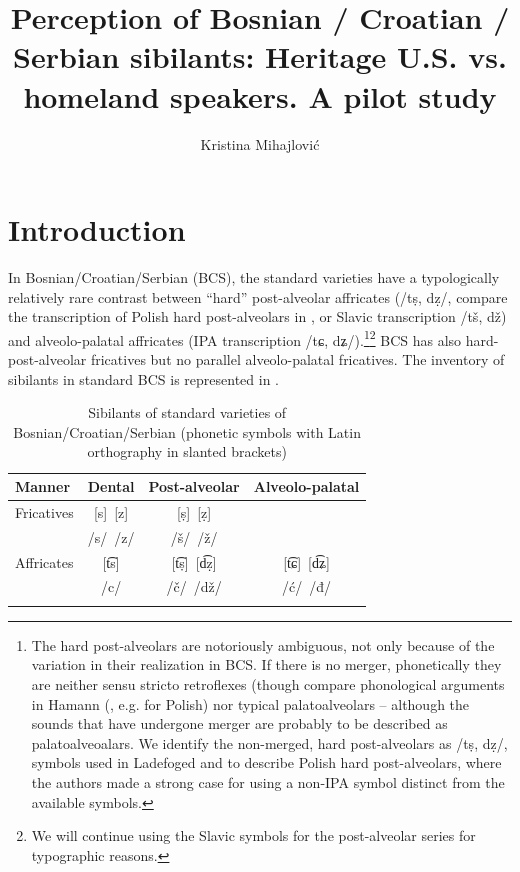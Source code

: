 \documentclass[output=paper,modfonts,nonflat,
]{langsci/langscibook}
\author{Kristina Mihajlović\affiliation{Department of Linguistics, University of Arizona}\lastand{Małgorzata Ćavar\affiliation{Department of Linguistics, Indiana University}}}
\title{Perception of Bosnian / Croatian / Serbian sibilants: Heritage U.S. vs. homeland speakers. A pilot study}
\begin{document}
\maketitle 
{}

 

\section{Introduction}

In Bosnian/Croatian/Serbian (BCS), the standard varieties have a typologically relatively rare contrast between “hard” post-alveolar affricates (/tṣ, dẓ/, compare the transcription of Polish  hard post-alveolars in \citet{LadefogedDisner2012}, or Slavic transcription /tš, dž) and alveolo-palatal affricates (IPA transcription /tɕ, dʑ/).\footnote{The hard post-alveolars are notoriously ambiguous, not only because of the variation in their realization in BCS. If there is no merger, phonetically they are neither sensu stricto retroflexes (though compare phonological arguments in Hamann (\citeyear*{Hamann2003}, e.g. for Polish) nor typical palatoalveolars – although the sounds that have undergone merger are probably to be described as palatoalveoalars. We identify the non-merged, hard post-alveolars as /tṣ, dẓ/, symbols used in Ladefoged and \citet[169]{Disner2012} to describe Polish hard post-alveolars, where the authors made a strong case for using a non-IPA symbol distinct from the available symbols.}\footnote{We will continue using the Slavic symbols for the post-alveolar series for typographic reasons.} BCS has also hard-post-alveolar fricatives but no parallel alveolo-palatal fricatives. The inventory of sibilants in standard BCS is represented in .


\begin{table}
\begin{tabularx}{\textwidth}{XCCC} 
\lsptoprule 
 Manner &   {     Dental} & { Post-alveolar} & {     Alveolo-palatal}\\
\midrule 
Fricatives & [s]~[z]& [ṣ]~[ẓ] \\
           & /s/~/z/& /š/~/ž/ \\
\tablevspace           
Affricates & [t͡s]   & [t͡ṣ]~[d͡ẓ] & [t͡ɕ]~[d͡ʑ]\\
           & /c/    & /č/~/dž/  & /ć/~/đ/\\
\lspbottomrule
\end{tabularx}
\caption{\label{tab:mihajlovic:1} Sibilants of standard varieties of Bosnian/Croatian/Serbian (phonetic symbols with Latin orthography in slanted brackets)}
\end{table}
\end{document}
